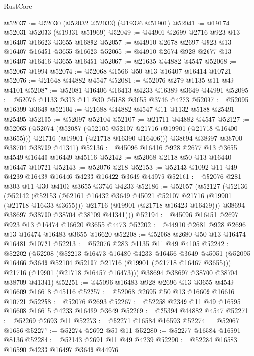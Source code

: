 \begin{lexlean}{RustCore}
\begin{coremodule}
@52037 := @52030 (@52032 @52033) (@19326 @51901)
@52041 := @19174 @52031 @52033 (@19331 @51969)
@52049 := @44901 @2699 @2716 @923 @13 @16407 @16623 @3655 @16892
@52057 := @44910 @2678 @2697 @923 @13 @16407 @16451 @3655 @16623
@52065 := @44910 @2674 @928 @2677 @13 @16407 @16416 @3655 @16451
@52067 := @21635 @44882 @4547
@52068 := @52067 @1994
@52074 := @52068 @1566 @50 @13 @16407 @16414 @10721
@52076 := @21648 @44882 @4547
@52081 := @52076 @279 @1135 @11 @49 @4101
@52087 := @52081 @16406 @16413 @4233 @16389 @3649 @44991
@52095 := @52076 @1133 @303 @11 @30 @5188 @3655 @3746 @4233
@52097 := @52095 @16399 @3649
@52104 := @21688 @44882 @4547 @11 @1132 @5188 @25491 @25495
@52105 := @52097 @52104
@52107 := @21711 @44882 @4547
@52127 := @52065
    (@52074
      (@52087
        (@52105 @52107 @21716 (@19901 (@21718 @16400 @3655)))
        @21716
        (@19901 (@21718 @16390 @16406)))
      @38694
      @38697
      @38700
      @38704
      @38709
      @41341)
@52136 := @45096 @16416 @928 @2677 @13 @3655 @4549 @16440 @16449 @45116
@52142 := @52068 @2118 @50 @13 @16440 @16447 @10721
@52143 := @52076 @218
@52153 := @52143 @1092 @11 @49 @4239 @16439 @16446 @4233 @16422 @3649 @44976
@52161 := @52076 @281 @303 @11 @30 @4103 @3655 @3746 @4233
@52186 := @52057
    (@52127
      (@52136
        (@52142
          (@52153
            (@52161 @16432 @3649 @45021 @52107 @21716 (@19901 (@21718 @16433 @3655)))
            @21716
            (@19901 (@21718 @16423 @16439)))
          @38694
          @38697
          @38700
          @38704
          @38709
          @41341)))
@52194 := @45096 @16451 @2697 @923 @13 @16474 @16620 @3655 @4473
@52202 := @44910 @2681 @928 @2696 @13 @16474 @16483 @3655 @16620
@52208 := @52068 @2680 @50 @13 @16474 @16481 @10721
@52213 := @52076 @283 @1135 @11 @49 @4105
@52242 := @52202
    (@52208
      (@52213
        @16473
        @16480
        @4233
        @16456
        @3649
        @45051
        (@52095 @16466 @3649 @52104 @52107 @21716 (@19901 (@21718 @16467 @3655)))
        @21716
        (@19901 (@21718 @16457 @16473)))
      @38694
      @38697
      @38700
      @38704
      @38709
      @41341)
@52251 := @45096 @16483 @928 @2696 @13 @3655 @4549 @16609 @16618 @45116
@52257 := @52068 @2695 @50 @13 @16609 @16616 @10721
@52258 := @52076 @2693
@52267 := @52258 @2349 @11 @49 @16595 @16608 @16615 @4233 @16489 @3649
@52269 := @25394 @44882 @4547
@52271 := @52269 @2693 @11
@52273 := @52271 @16584 @16593
@52274 := @52067 @1656
@52277 := @52274 @2692 @50 @11
@52280 := @52277 @16584 @16591 @8136
@52284 := @52143 @2691 @11 @49 @4239
@52290 := @52284 @16583 @16590 @4233 @16497 @3649 @44976

\end{coremodule}
\end{lexlean}
